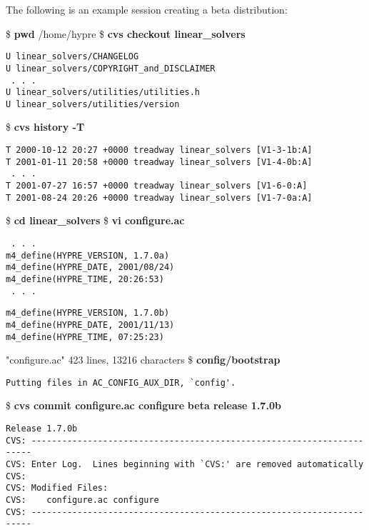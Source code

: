 The following is an example session creating a beta distribution:
\begin{ttfamily}
\begin{mdseries}
\linebreak
\$ \textbf{pwd}\linebreak
/home/hypre\linebreak
\$ \textbf{cvs checkout linear\_solvers}\linebreak
\begin{verbatim}
U linear_solvers/CHANGELOG
U linear_solvers/COPYRIGHT_and_DISCLAIMER
 . . .
U linear_solvers/utilities/utilities.h
U linear_solvers/utilities/version
\end{verbatim}
\$ \textbf{cvs history -T}\linebreak
\begin{verbatim}
T 2000-10-12 20:27 +0000 treadway linear_solvers [V1-3-1b:A]
T 2001-01-11 20:58 +0000 treadway linear_solvers [V1-4-0b:A]
 . . .
T 2001-07-27 16:57 +0000 treadway linear_solvers [V1-6-0:A]
T 2001-08-24 20:26 +0000 treadway linear_solvers [V1-7-0a:A]
\end{verbatim}
\$ \textbf{cd linear\_solvers}\linebreak
\$ \textbf{vi configure.ac}\linebreak
\begin{verbatim}
 . . .
m4_define(HYPRE_VERSION, 1.7.0a)
m4_define(HYPRE_DATE, 2001/08/24)
m4_define(HYPRE_TIME, 20:26:53)
 . . .
\end{verbatim}
\begin{bfseries}
\begin{verbatim}
m4_define(HYPRE_VERSION, 1.7.0b)
m4_define(HYPRE_DATE, 2001/11/13)
m4_define(HYPRE_TIME, 07:25:23)
\end{verbatim}
\end{bfseries}
"configure.ac" 423 lines, 13216 characters\linebreak
\$ \textbf{config/bootstrap}
\begin{verbatim}
Putting files in AC_CONFIG_AUX_DIR, `config'.
\end{verbatim}
\$ \textbf{cvs commit configure.ac configure}\linebreak
\textbf{beta release 1.7.0b}\linebreak
\begin{verbatim}
Release 1.7.0b
CVS: ----------------------------------------------------------------------
CVS: Enter Log.	 Lines beginning with `CVS:' are removed automatically
CVS:
CVS: Modified Files:
CVS:	configure.ac configure
CVS: ----------------------------------------------------------------------

\end{verbatim}
\end{mdseries}
\end{ttfamily}
